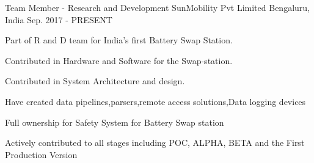

\begin{cventries}

  \cventry
    {Team Member - Research and Development} %
    {SunMobility Pvt Limited} %
    {Bengaluru, India} %
    {Sep. 2017 - PRESENT} %
    {
      \begin{cvitems} %
        \item {Part of R and D team for India's first Battery Swap Station.}
        \item {Contributed in Hardware and Software for the Swap-station.}
        \item {Contributed in System Architecture and design.}
        \item {Have created data pipelines,parsers,remote access solutions,Data logging devices}
        \item {Full ownership for Safety System for Battery Swap station}
        \item {Actively contributed to all stages including POC, ALPHA, BETA and the First Production Version}
      \end{cvitems}
    }

\end{cventries}
